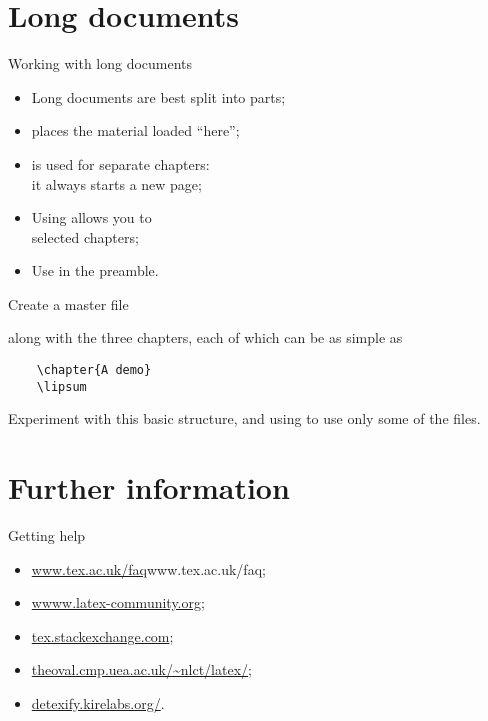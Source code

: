 \section{Long documents}

\begin{frame}{Working with long documents}

  \begin{itemize}
    \item Long documents are best split into parts;
    \item {} places the material loaded \enquote{here};
    \item {} is used for separate chapters:\\ it always starts
      a new page;
    \item Using  allows you to \\
      selected chapters;
    \item Use  in the preamble.
  \end{itemize}
  
\end{frame}

\begin{exercise}

  Create a master file
  
  along with the three chapters, each of which can be as simple as
  \begin{verbatim}
    \chapter{A demo}
    \lipsum
  \end{verbatim}
  Experiment with this basic structure, and using  to
  use only some of the files.

\end{exercise}


\section{Further information}

\begin{frame}{Getting help}

  \begin{itemize}
    \item \url{www.tex.ac.uk/faq}{www.tex.ac.uk/faq};
    \item \url{wwww.latex-community.org};
    \item \url{tex.stackexchange.com};
    \item \url{theoval.cmp.uea.ac.uk/~nlct/latex/};
    \item \url{detexify.kirelabs.org/}.
  \end{itemize}

\end{frame}


